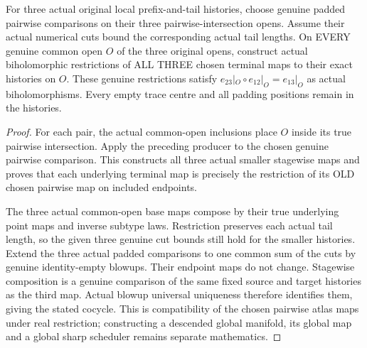 \begin{theorem}
\label{hir:sharp-actual-chosen-pairwise-overlap-cocycle}
\leanok
For three actual original local prefix-and-tail histories, choose genuine
padded pairwise comparisons on their three pairwise-intersection opens.
Assume their actual numerical cuts bound the corresponding actual tail
lengths. On EVERY genuine common open $O$ of the three original opens,
construct actual biholomorphic restrictions of ALL THREE chosen terminal
maps to their exact histories on $O$. These genuine restrictions satisfy
$e_{23}|_O\circ e_{12}|_O=e_{13}|_O$ as actual biholomorphisms. Every empty trace centre and
all padding positions remain in the histories.
\end{theorem}
\begin{proof}
For each pair, the actual common-open inclusions place $O$ inside its true
pairwise intersection. Apply the preceding producer to the chosen genuine
pairwise comparison. This constructs all three actual smaller stagewise
maps and proves that each underlying terminal map is precisely the
restriction of its OLD chosen pairwise map on included endpoints.

The three actual common-open base maps compose by their true underlying
point maps and inverse subtype laws. Restriction preserves each actual tail
length, so the given three genuine cut bounds still hold for the smaller
histories. Extend the three actual padded comparisons to one common sum of
the cuts by genuine identity-empty blowups. Their endpoint maps do not
change. Stagewise composition is a genuine comparison of the same fixed
source and target histories as the third map. Actual blowup universal
uniqueness therefore identifies them, giving the stated cocycle. This is
compatibility of the chosen pairwise atlas maps under real restriction;
constructing a descended global manifold, its global map and a global
sharp scheduler remains separate mathematics.
\end{proof}
